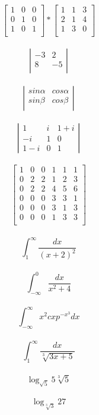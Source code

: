 \documentclass[a4paper]{article}
\begin{document}
\\
$$\begin{bmatrix}
1 & 0 & 0 \\
0 & 1 & 0 \\
1 & 0 & 1 \\
\end{bmatrix}
*
\begin{bmatrix}
1 & 1 & 3 \\
2 & 1 & 4  \\
1 & 3 & 0  \\
\end{bmatrix}$$
\\
$$  
\left | \begin{array}{rr}
-3 & 2 \\
8 & -5 \\
\end{array}
\right| $$
\\
$$  
\left | \begin{array}{rr}
sin\alpha & cos\alpha \\
sin\beta & cos \beta \\
\end{array}
\right| $$
\\
$$  
\left | \begin{array}{ccc}
1 & i & 1+i \\
-i & 1 & 0 \\
1-i & 0 & 1
\end{array}
\right| $$
\\
$$  
\left [ \begin{array}{c|cc|ccc}
1 & 0 & 0 & 1 & 1 & 1 \\
\hline
0 & 2 & 2 & 1 & 2 & 3 \\
0 & 2 & 2 & 4 & 5 & 6 \\
\hline
0 & 0 & 0 & 3 & 3 & 1 \\
0 & 0 & 0 & 3 & 1 & 3 \\
0 & 0 & 0 & 1 & 3 & 3 \\
\end{array}
\right] $$
\\
$$
\int_{1}^{\infty} \frac{dx}{(x+2)^2}
$$
\\
$$
\int_{-\infty}^{0} \frac{dx}{x^2 + 4}
$$
\\
$$
\int_{-\infty}^{\infty} x^2cxp^{-x^3}dx
$$
\\
$$
\int_{1}^{\infty} \frac{dx}{\sqrt[3]{3x+5}}
$$
\\
$$
\log_{\sqrt{5}}5{\sqrt[3]{5}} $$
\\
$$
\log_{\sqrt[3]{3}}27 $$
\\
\end{document}
